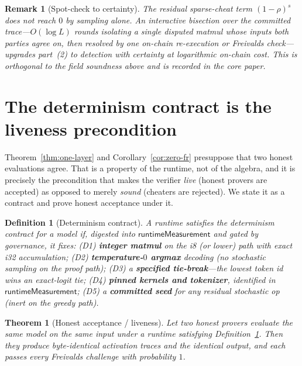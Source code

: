 \documentclass[11pt]{article}
\newtheorem{theorem}{Theorem}
\newtheorem{definition}{Definition}
\newtheorem{remark}{Remark}
\newcommand{\runtime}{\mathsf{runtimeMeasurement}}
\begin{document}
\begin{remark}[Spot-check to certainty]
The residual sparse-cheat term $(1-\rho)^s$ does not reach $0$ by sampling alone. An
interactive bisection over the committed trace---$O(\log L)$ rounds isolating a single
disputed matmul whose inputs both parties agree on, then resolved by one on-chain
re-execution or Freivalds check---upgrades part~(2) to detection with \emph{certainty} at
logarithmic on-chain cost. This is orthogonal to the field soundness above and is recorded in
the core paper.
\end{remark}

\section{The determinism contract is the liveness precondition}
\label{sec:determinism}

Theorem~\ref{thm:one-layer} and Corollary~\ref{cor:zero-fr} presuppose that two honest
evaluations agree. That is a property of the runtime, not of the algebra, and it is precisely
the precondition that makes the verifier \emph{live} (honest provers are accepted) as opposed
to merely \emph{sound} (cheaters are rejected). We state it as a contract and prove honest
acceptance under it.

\begin{definition}[Determinism contract]
\label{def:contract}
A runtime satisfies the determinism contract for a model if, digested into $\runtime$ and
gated by governance, it fixes: (D1) \textbf{integer matmul} on the i8 (or lower) path with
exact i32 accumulation; (D2) \textbf{temperature-$0$ argmax} decoding (no stochastic
sampling on the proof path); (D3) a \textbf{specified tie-break}---the \emph{lowest token id}
wins an exact-logit tie; (D4) \textbf{pinned kernels and tokenizer}, identified in $\runtime$;
(D5) a \textbf{committed seed} for any residual stochastic op (inert on the greedy path).
\end{definition}

\begin{theorem}[Honest acceptance / liveness]
\label{thm:liveness}
Let two honest provers evaluate the same model on the same input under a runtime satisfying
Definition~\ref{def:contract}. Then they produce byte-identical activation traces and the
identical output, and each passes every Freivalds challenge with probability $1$.
\end{theorem}
\end{document}
